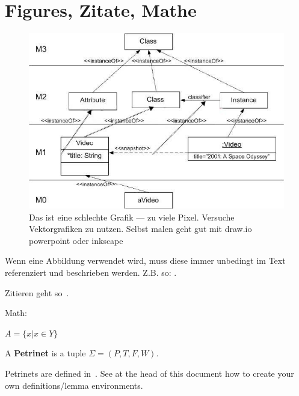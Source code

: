 \section{Figures, Zitate, Mathe}
\begin{figure}[h]
\centering
\includegraphics[scale=0.8]{images/OMG_MOF_4levels.jpg}
\caption{Das ist eine schlechte Grafik --- zu viele Pixel. Versuche Vektorgrafiken zu nutzen. Selbst malen geht gut mit draw.io powerpoint
  oder inkscape}\label{fig:mof}
\end{figure}

Wenn eine Abbildung verwendet wird, muss diese immer unbedingt im Text referenziert und beschrieben werden.
Z.B. so: .

Zitieren geht so~\cite{haddadin2013towards}.

Math:

$A = \{x | x \in Y\}$

\begin{defs}\label{def:abc}
    A \textbf{Petrinet} is a tuple ${\Sigma = (P, T, F, W)}$.
\end{defs}

Petrinets are defined in~. See at the head of this document how to create your own definitions/lemma environments.

